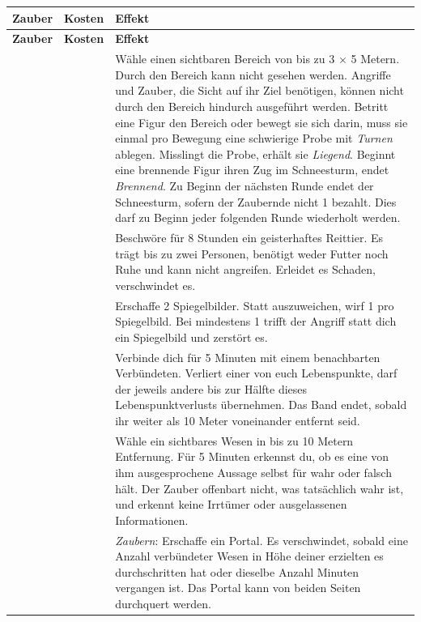 
\begingroup
\hplongtablestyle
\begin{xltabular}{\linewidth}{L{3.4cm} C{2.1cm} Y}
\textbf{Zauber} & \textbf{Kosten} & \textbf{Effekt} \\
\hline
\endfirsthead
\textbf{Zauber} & \textbf{Kosten} & \textbf{Effekt} \\
\hline
\endhead
{} &  & Wähle einen sichtbaren Bereich von bis zu 3 $\times$ 5 Metern. Durch den Bereich kann nicht gesehen werden. Angriffe und Zauber, die Sicht auf ihr Ziel benötigen, können nicht durch den Bereich hindurch ausgeführt werden. Betritt eine Figur den Bereich oder bewegt sie sich darin, muss sie einmal pro Bewegung eine schwierige Probe mit \emph{Turnen} ablegen. Misslingt die Probe, erhält sie \statusProne{} \emph{Liegend}. Beginnt eine brennende Figur ihren Zug im Schneesturm, endet \statusBurning{} \emph{Brennend}. Zu Beginn der nächsten Runde endet der Schneesturm, sofern der Zaubernde nicht 1\manaLoss{} bezahlt. Dies darf zu Beginn jeder folgenden Runde wiederholt werden. \\
 &  & Beschwöre für 8 Stunden ein geisterhaftes Reittier. Es trägt bis zu zwei Personen, benötigt weder Futter noch Ruhe und kann nicht angreifen. Erleidet es Schaden, verschwindet es. \\
 &  & Erschaffe 2 Spiegelbilder. Statt auszuweichen, wirf 1\blueDie{} pro Spiegelbild. Bei mindestens 1\star{} trifft der Angriff statt dich ein Spiegelbild und zerstört es. \\
 &  & Verbinde dich für 5 Minuten mit einem benachbarten Verbündeten. Verliert einer von euch Lebenspunkte, darf der jeweils andere bis zur Hälfte dieses Lebenspunktverlusts übernehmen. Das Band endet, sobald ihr weiter als 10 Meter voneinander entfernt seid. \\
 &  & Wähle ein sichtbares Wesen in bis zu 10 Metern Entfernung. Für 5 Minuten erkennst du, ob es eine von ihm ausgesprochene Aussage selbst für wahr oder falsch hält. Der Zauber offenbart nicht, was tatsächlich wahr ist, und erkennt keine Irrtümer oder ausgelassenen Informationen. \\
 &  & \emph{Zaubern}: Erschaffe ein Portal. Es verschwindet, sobald eine Anzahl verbündeter Wesen in Höhe deiner erzielten \star{} es durchschritten hat oder dieselbe Anzahl Minuten vergangen ist. Das Portal kann von beiden Seiten durchquert werden. \\

\end{xltabular}

